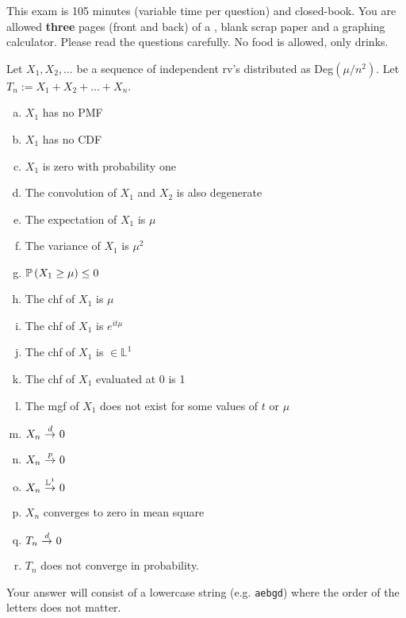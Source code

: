 \documentclass[12pt,landscape]{article}
\newcommand{\instr}{\small Your answer will consist of a lowercase string (e.g. \texttt{aebgd}) where the order of the letters does not matter. \normalsize}
\begin{document}
This exam is 105 minutes (variable time per question) and closed-book. You are allowed \textbf{three} pages (front and back) of a , blank scrap paper and a graphing calculator. Please read the questions carefully. No food is allowed, only drinks. %

\pagebreak

\problem{} Let $X_1, X_2, \ldots$ be a sequence of independent rv's distributed as Deg$(\mu / n^2)$. Let $T_n := X_1 + X_2 + \ldots + X_n$.

\vspace{-0.2cm}\benum{} 

\begin{enumerate}[(a)]
\item $X_1$ has no PMF
\item $X_1$ has no CDF
\item $X_1$ is zero with probability one
\item The convolution of $X_1$ and $X_2$ is also degenerate
\item The expectation of $X_1$ is $\mu$
\item The variance of $X_1$ is $\mu^2$
\item $\mathbb{P}\left(X_1 \geq \mu\right) \leq 0$
\item The chf of $X_1$ is $\mu$
\item The chf of $X_1$ is $e^{it\mu}$
\item The chf of $X_1$ is $\in \mathbb{L}^1$
\item The chf of $X_1$ evaluated at 0 is 1
\item The mgf of $X_1$ does not exist for some values of $t$ or $\mu$
\item $X_n \convd 0$
\item $X_n \convp 0$
\item $X_n \convLp{1} 0$
\item $X_n$ converges to zero in mean square
\item $T_n \convd 0$
\item $T_n$ does not converge in probability.
\end{enumerate}
\eenum\instr\pagebreak
\end{document}
